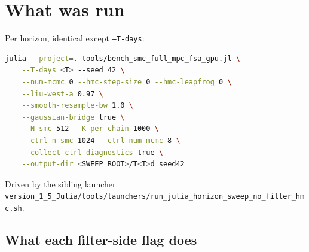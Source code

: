 \documentclass[11pt,a4paper]{article}
\begin{document}
\section{What was run}
\label{sec:cli}

Per horizon, identical except \texttt{--T-days}:

\begin{lstlisting}[language=bash]
julia --project=. tools/bench_smc_full_mpc_fsa_gpu.jl \
    --T-days <T> --seed 42 \
    --num-mcmc 0 --hmc-step-size 0 --hmc-leapfrog 0 \
    --liu-west-a 0.97 \
    --smooth-resample-bw 1.0 \
    --gaussian-bridge true \
    --N-smc 512 --K-per-chain 1000 \
    --ctrl-n-smc 1024 --ctrl-num-mcmc 8 \
    --collect-ctrl-diagnostics true \
    --output-dir <SWEEP_ROOT>/T<T>d_seed42
\end{lstlisting}

Driven by the sibling launcher
\texttt{version\_1\_5\_Julia/tools/launchers/run\_julia\_horizon\_sweep\_no\_filter\_hmc.sh}.

\subsection{What each filter-side flag does}
\end{document}
